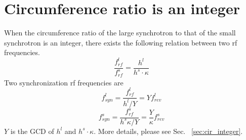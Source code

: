 %
%
% 
%
\section{Circumference ratio is an integer}
\label{sec:integ}
When the circumference ratio of the large synchrotron to that of the small synchrotron is an integer, there exists the following relation between two rf frequencies. 
\begin{equation}
\frac{f_{\mathit{rf}}^{l}}{f_{\mathit{rf}}^{s}}= \frac{h^l}{h^s \cdot \kappa}
\end{equation}
Two synchronization rf frequencies are
\begin{equation}
f_{\mathit{syn}}^{l}=\frac{f_{\mathit{rf}}^{l}}{h^{l}/Y}=Y f_{\mathit{rev}}^{l} \label{synch_freq1_r}
\end{equation}
\begin{equation}
f_{\mathit{syn}}^{s}=\frac{f_{\mathit{rf}}^{s}}{h^{s}\kappa/Y}=\frac{Y}{\kappa} f_{\mathit{rev}}^{s} \label{synch_freq2_r}
\end{equation}
$Y$ is the \gls{GCD} of $h^l$ and $h^s \cdot \kappa$. More details, please see Sec. ~\ref{sec:cir_integer}.

